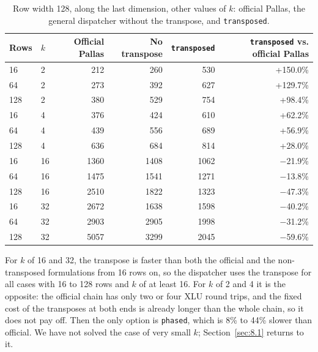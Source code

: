 \documentclass[sigconf,nonacm,balance=false]{acmart}
\newcommand{\code}[1]{\texttt{#1}}
\begin{document}
\begin{table}
\centering
\caption{Row width 128, along the last dimension, other values of $k$: official Pallas, the general dispatcher without the transpose, and \code{transposed}.}
\label{tab:10}
\begin{tabular}{llrrrr}
\toprule
Rows & $k$ & Official Pallas & No transpose & \code{transposed} & \code{transposed} vs. official Pallas \\
\midrule
16 & 2 & 212 & 260 & 530 & +150.0\% \\
64 & 2 & 273 & 392 & 627 & +129.7\% \\
128 & 2 & 380 & 529 & 754 & +98.4\% \\
16 & 4 & 376 & 424 & 610 & +62.2\% \\
64 & 4 & 439 & 556 & 689 & +56.9\% \\
128 & 4 & 636 & 684 & 814 & +28.0\% \\
16 & 16 & 1360 & 1408 & 1062 & $-$21.9\% \\
64 & 16 & 1475 & 1541 & 1271 & $-$13.8\% \\
128 & 16 & 2510 & 1822 & 1323 & $-$47.3\% \\
16 & 32 & 2672 & 1638 & 1598 & $-$40.2\% \\
64 & 32 & 2903 & 2905 & 1998 & $-$31.2\% \\
128 & 32 & 5057 & 3299 & 2045 & $-$59.6\% \\
\bottomrule
\end{tabular}
\end{table}

For $k$ of 16 and 32, the transpose is faster than both the official and the non-transposed formulations from 16 rows on, so the dispatcher uses the transpose for all cases with 16 to 128 rows and $k$ of at least 16. For $k$ of 2 and 4 it is the opposite: the official chain has only two or four XLU round trips, and the fixed cost of the transposes at both ends is already longer than the whole chain, so it does not pay off. Then the only option is \code{phased}, which is 8\% to 44\% slower than official. We have not solved the case of very small $k$; Section~\ref{sec:8.1} returns to it.
\end{document}
